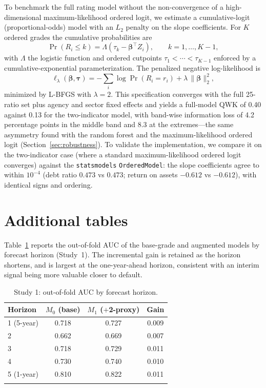 \documentclass[pdflatex,sn-mathphys-ay]{sn-jnl}
\begin{document}
\begin{appendices}
To benchmark the full rating model without the non-convergence of a high-dimensional
maximum-likelihood ordered logit, we estimate a cumulative-logit (proportional-odds) model with an
$L_2$ penalty on the slope coefficients. For $K$ ordered grades the cumulative probabilities are
\begin{equation}
\Pr(R_i \le k) = \Lambda(\tau_k - \boldsymbol{\beta}^{\top}Z_i), \qquad k = 1,\dots,K-1,
\end{equation}
with $\Lambda$ the logistic function and ordered cutpoints $\tau_1 < \cdots < \tau_{K-1}$ enforced by a
cumulative-exponential parameterization. The penalized negative log-likelihood is
\begin{equation}
\ell_{\lambda}(\boldsymbol{\beta},\boldsymbol{\tau}) = -\sum_{i} \log\Pr(R_i = r_i) + \lambda\,\lVert\boldsymbol{\beta}\rVert_2^2,
\end{equation}
minimized by L-BFGS with $\lambda=2$. This specification converges with the full 25-ratio set plus
agency and sector fixed effects and yields a full-model QWK of 0.40 against 0.13 for the two-indicator
model, with band-wise information loss of 4.2 percentage points in the middle band and 8.3 at the
extremes---the same asymmetry found with the random forest and the maximum-likelihood ordered logit
(Section~\ref{sec:robustness}). To validate the implementation, we compare it on the two-indicator case
(where a standard maximum-likelihood ordered logit converges) against the \texttt{statsmodels}
\texttt{OrderedModel}: the slope coefficients agree to within $10^{-4}$ (debt ratio $0.473$ vs $0.473$;
return on assets $-0.612$ vs $-0.612$), with identical signs and ordering.

\section{Additional tables}\label{app:tables}

Table~\ref{tab:gradient} reports the out-of-fold AUC of the base-grade and augmented models by
forecast horizon (Study~1). The incremental gain is retained as the horizon shortens, and is largest at
the one-year-ahead horizon, consistent with an interim signal being more valuable closer to default.

\begin{table}[h]
\centering
\caption{Study 1: out-of-fold AUC by forecast horizon.}
\label{tab:gradient}
\begin{tabular}{@{}lccc@{}}
\toprule
Horizon & $M_0$ (base) & $M_1$ ($+$2-proxy) & Gain \\
\midrule
1 (5-year) & 0.718 & 0.727 & 0.009 \\
2          & 0.662 & 0.669 & 0.007 \\
3          & 0.718 & 0.729 & 0.011 \\
4          & 0.730 & 0.740 & 0.010 \\
5 (1-year) & 0.810 & 0.822 & 0.011 \\
\botrule
\end{tabular}
\end{table}

\end{appendices}


\end{document}
